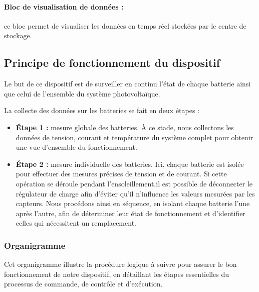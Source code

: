 \paragraph{Bloc de visualisation de données :}
ce bloc permet de visualiser les données en temps réel stockées par le centre de stockage.

\subsection{Principe de fonctionnement du dispositif}

Le but de ce dispositif est de surveiller en continu l'état de chaque batterie ainsi que celui de l'ensemble du système photovoltaïque.

La collecte des données sur les batteries se fait en deux étapes :

\begin{itemize} \item \textbf{Étape 1 :} mesure globale des batteries.
	À ce stade, nous collectons les données de tension, courant et température du système complet pour obtenir une vue d'ensemble du fonctionnement.
\item \textbf{Étape 2 :} mesure individuelle des batteries.  
Ici, chaque batterie est isolée pour effectuer des mesures précises de tension et de courant. Si cette opération se déroule pendant l'ensoleillement,il est possible de déconnecter le régulateur de charge afin d'éviter qu'il n'influence les valeurs mesurées par les capteurs. Nous procédons ainsi en séquence, en isolant chaque batterie l’une après l’autre, afin de déterminer leur état de fonctionnement et d'identifier celles qui nécessitent un remplacement.
\end{itemize}

\subsubsection{Organigramme}

Cet organigramme illustre la procédure logique à suivre pour assurer le bon fonctionnement de notre dispositif, en détaillant les étapes essentielles du processus de commande, de contrôle et d’exécution.



